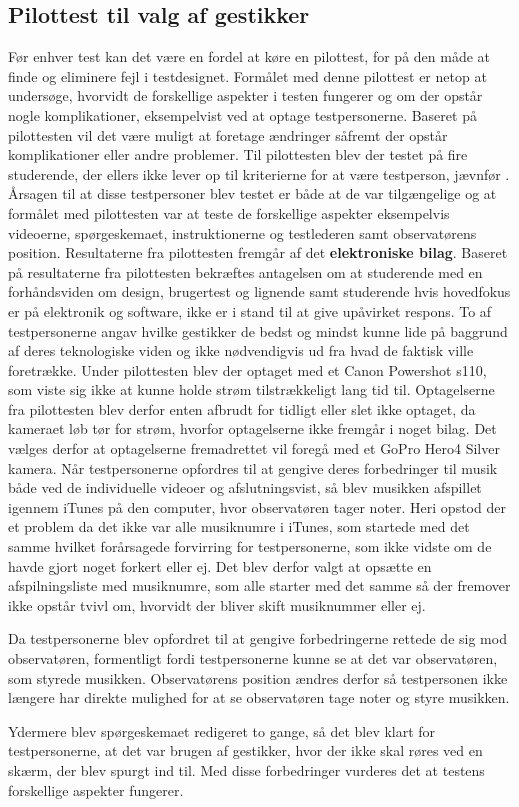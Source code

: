 \subsection{Pilottest til valg af gestikker}
\label{PilottestValgAfGestikker}
%
Før enhver test kan det være en fordel at køre en pilottest, for på den måde at finde og eliminere fejl i testdesignet. Formålet med denne pilottest er netop at undersøge, hvorvidt de forskellige aspekter i testen fungerer og om der opstår nogle komplikationer, eksempelvist ved at optage testpersonerne. Baseret på pilottesten vil det være muligt at foretage ændringer såfremt der opstår komplikationer eller andre problemer.\blankline
%  
Til pilottesten blev der testet på fire studerende, der ellers ikke lever op til kriterierne for at være testperson, jævnfør . Årsagen til at disse testpersoner blev testet er både at de var tilgængelige og at formålet med pilottesten var at teste de forskellige aspekter eksempelvis videoerne, spørgeskemaet, instruktionerne og testlederen samt observatørens position. Resultaterne fra pilottesten fremgår af det \textbf{elektroniske bilag}. Baseret på resultaterne fra pilottesten bekræftes antagelsen om at studerende med en forhåndsviden om design, brugertest og lignende samt studerende hvis hovedfokus er på elektronik og software, ikke er i stand til at give upåvirket respons. To af testpersonerne angav hvilke gestikker de bedst og mindst kunne lide på baggrund af deres teknologiske viden og ikke nødvendigvis ud fra hvad de faktisk ville foretrække.\blankline
% 
Under pilottesten blev der optaget med et Canon Powershot s110, som viste sig ikke at kunne holde strøm tilstrækkeligt lang tid til. Optagelserne fra pilottesten blev derfor enten afbrudt for tidligt eller slet ikke optaget, da kameraet løb tør for strøm, hvorfor optagelserne ikke fremgår i noget bilag. Det vælges derfor at optagelserne fremadrettet vil foregå med et GoPro Hero4 Silver kamera.\blankline
% 
Når testpersonerne opfordres til at gengive deres forbedringer til musik både ved de individuelle videoer og afslutningsvist, så blev musikken afspillet igennem iTunes på den computer, hvor observatøren tager noter. Heri opstod der et problem da det ikke var alle musiknumre i iTunes, som startede med det samme hvilket forårsagede forvirring for testpersonerne, som ikke vidste om de havde gjort noget forkert eller ej. Det blev derfor valgt at opsætte en afspilningsliste med musiknumre, som alle starter med det samme så der fremover ikke opstår tvivl om, hvorvidt der bliver skift musiknummer eller ej. 

Da testpersonerne blev opfordret til at gengive forbedringerne rettede de sig mod observatøren, formentligt fordi testpersonerne kunne se at det var observatøren, som styrede musikken. Observatørens position ændres derfor så testpersonen ikke længere har direkte mulighed for at se observatøren tage noter og styre musikken. 

Ydermere blev spørgeskemaet redigeret to gange, så det blev klart for testpersonerne, at det var brugen af gestikker, hvor der ikke skal røres ved en skærm, der blev spurgt ind til. \blankline
%
Med disse forbedringer vurderes det at testens forskellige aspekter fungerer.  
 


